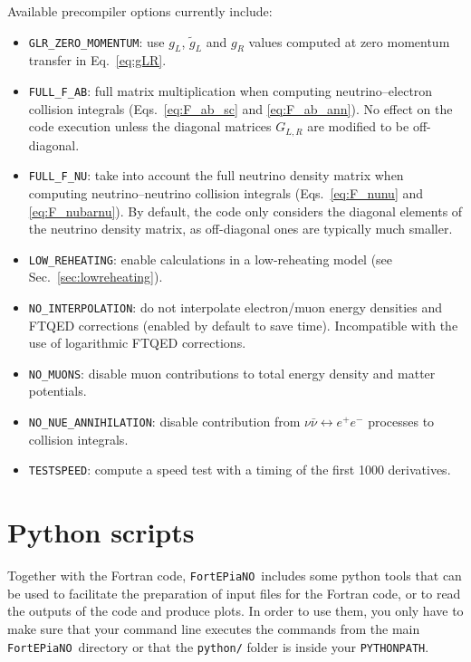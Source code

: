 \documentclass[notitlepage,showpacs,preprintnumbers,amsmath,amssymb,superscriptaddress,prd,onecolumn]{revtex4-1}
\newcommand{\fortepiano}{\texttt{FortEPiaNO}}
\begin{document}
Available precompiler options currently include:
%
\begin{itemize}
%
\item \texttt{GLR\_ZERO\_MOMENTUM}: use $g_L$, $\tilde g_L$ and $g_R$ values
computed at zero momentum transfer \cite{Erler:2013xha} in Eq.~\eqref{eq:gLR}.
%
\item \texttt{FULL\_F\_AB}: full matrix multiplication
when computing neutrino--electron collision integrals
(Eqs.~\eqref{eq:F_ab_sc} and \eqref{eq:F_ab_ann}).
No effect on the code execution unless the diagonal matrices $G_{L,R}$ are modified to be off-diagonal.
%
\item \texttt{FULL\_F\_NU}: take into account the full neutrino density matrix
when computing neutrino--neutrino collision integrals
(Eqs.~\eqref{eq:F_nunu} and \eqref{eq:F_nubarnu}).
By default, the code only considers the diagonal elements of the neutrino density matrix,
as off-diagonal ones are typically much smaller.
%
\item \texttt{LOW\_REHEATING}: enable calculations in a low-reheating model (see Sec.~\ref{sec:lowreheating}).
%
\item \texttt{NO\_INTERPOLATION}: do not interpolate electron/muon energy densities and FTQED corrections
(enabled by default to save time). Incompatible with the use of logarithmic FTQED corrections.
%
\item \texttt{NO\_MUONS}: disable muon contributions to total energy density and matter potentials.
%
\item \texttt{NO\_NUE\_ANNIHILATION}: disable contribution from $\nu\bar\nu\leftrightarrow e^+e^-$ processes to collision integrals.
%
\item \texttt{TESTSPEED}: compute a speed test with a timing of the first 1000 derivatives.
%
\end{itemize}


\section{Python scripts}
\label{sec:python}
Together with the Fortran code, \fortepiano\ includes some python tools
that can be used to facilitate the preparation of input files for the Fortran code,
or to read the outputs of the code and produce plots.
In order to use them,
you only have to make sure that
your command line executes the commands from the main \fortepiano\ directory or
that the \texttt{python/} folder is inside your \texttt{PYTHONPATH}.

\smallskip
\end{document}
